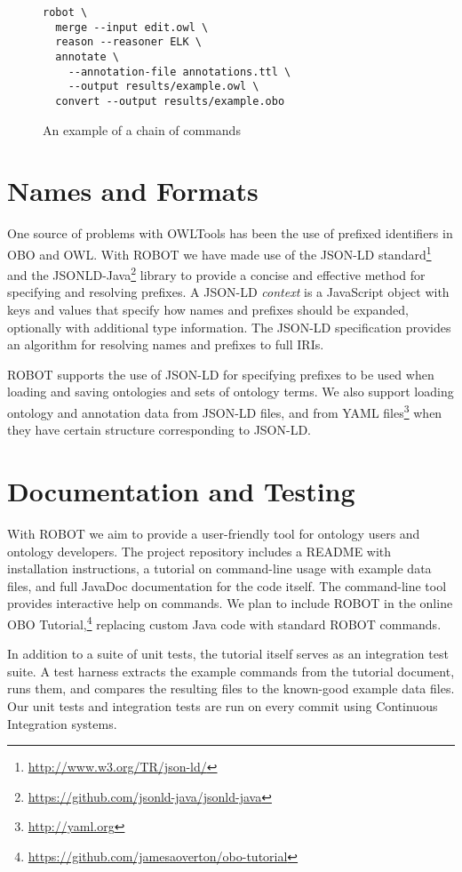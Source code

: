 \documentclass{icbo}
\begin{document}
\begin{figure}
\begin{verbatim}
robot \
  merge --input edit.owl \
  reason --reasoner ELK \
  annotate \
    --annotation-file annotations.ttl \
    --output results/example.owl \
  convert --output results/example.obo
\end{verbatim}
\caption{An example of a chain of commands}
\label{chain}
\end{figure}


\section{Names and Formats}

One source of problems with OWLTools has been the use of prefixed identifiers in OBO and OWL. With ROBOT we have made use of the JSON-LD standard\footnote{\url{http://www.w3.org/TR/json-ld/}} and the JSONLD-Java\footnote{\url{https://github.com/jsonld-java/jsonld-java}} library to provide a concise and effective method for specifying and resolving prefixes. A JSON-LD {\it context} is a JavaScript object with keys and values that specify how names and prefixes should be expanded, optionally with additional type information. The JSON-LD specification provides an algorithm for resolving names and prefixes to full IRIs.

ROBOT supports the use of JSON-LD for specifying prefixes to be used when loading and saving ontologies and sets of ontology terms. We also support loading ontology and annotation data from JSON-LD files, and from YAML files\footnote{\url{http://yaml.org}} when they have certain structure corresponding to JSON-LD.


\section{Documentation and Testing}

With ROBOT we aim to provide a user-friendly tool for ontology users and ontology developers. The project repository includes a README with installation instructions, a tutorial on command-line usage with example data files, and full JavaDoc documentation for the code itself. The command-line tool provides interactive help on commands. We plan to include ROBOT in the online OBO Tutorial,\footnote{\url{https://github.com/jamesaoverton/obo-tutorial}} replacing custom Java code with standard ROBOT commands.

In addition to a suite of unit tests, the tutorial itself serves as an integration test suite. A test harness extracts the example commands from the tutorial document, runs them, and compares the resulting files to the known-good example data files. Our unit tests and integration tests are run on every commit using Continuous Integration systems.
\end{document}
